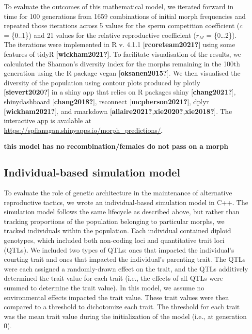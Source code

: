 \documentclass[
  11pt,
]{article}
\begin{document}
To evaluate the outcomes of this mathematical model, we iterated forward
in time for 100 generations from 1659 combinations of initial morph
frequencies and repeated those iterations across 5 values for the sperm
competition coefficient (\(c\) = \{0..1\}) and 21 values for the relative
reproductive coefficient (\(r_M\) = \{0\ldots2\}). The iterations were
implemented in R v. 4.1.1 {[}\textbf{rcoreteam2021?}{]} using some features of tidyR
{[}\textbf{wickham2021?}{]}. To facilitate visualisation of the results, we
calculated the Shannon's diversity index for the morphs remaining in the
100th generation using the R package vegan {[}\textbf{oksanen2015?}{]}. We then
visualised the diversity of the population using contour plots produced
by plotly {[}\textbf{sievert2020?}{]} in a shiny app that relies on R packages shiny
{[}\textbf{chang2021?}{]}, shinydashboard {[}\textbf{chang2018?}{]}, rsconnect {[}\textbf{mcpherson2021?}{]},
dplyr {[}\textbf{wickham2021?}{]}, and rmarkdown {[}\textbf{allaire2021?},\textbf{xie2020?},\textbf{xie2018?}{]}.
The interactive app is available at
\url{https://spflanagan.shinyapps.io/morph_predictions/}.

\textbf{this model has no recombination/females do not pass on a morph}

\hypertarget{individual-based-simulation-model}{%
\subsection{Individual-based simulation model}\label{individual-based-simulation-model}}

To evaluate the role of genetic architecture in the maintenance of
alternative reproductive tactics, we wrote an individual-based
simulation model in C++. The simulation model follows the same lifecycle
as described above, but rather than tracking proportions of the
population belonging to particular morphs, we tracked individuals within
the population. Each individual contained diploid genotypes, which
included both non-coding loci and quantitative trait loci (QTLs). We
included two types of QTLs: ones that impacted the individual's courting
trait and ones that impacted the individual's parenting trait. The QTLs
were each assigned a randomly-drawn effect on the trait, and the QTLs
additively determined the trait value for each trait (i.e., the effects
of all QTLs were summed to determine the trait value). In this model, we
assume no environmental effects impacted the trait value. These trait
values were then compared to a threshold to dichotomize each trait. The
threshold for each trait was the mean trait value during the
initialization of the model (i.e., at generation 0).
\end{document}
